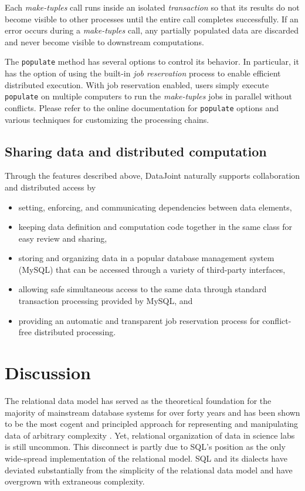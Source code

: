 \documentclass[10pt,letterpaper]{article}
\newcommand{\matlab}[1]{\texttt{#1}}
\begin{document}
Each \emph{make-tuples} call runs inside an isolated \emph{transaction} so that its results  do not become visible to other processes until the entire call completes successfully. 
If an error occurs during a \emph{make-tuples} call, any partially populated data are discarded and never become visible to downstream computations.

The \matlab{populate} method has several options to control its behavior. 
In particular, it has the option of using the built-in \emph{job reservation} process to enable efficient distributed execution. 
With job reservation enabled, users simply execute \matlab{populate} on multiple computers to run the \emph{make-tuples} jobs in parallel  without conflicts.
Please refer to the online documentation for \matlab{populate} options and various techniques for customizing the processing chains.

\subsection*{Sharing data and distributed computation}
Through the features described above, DataJoint naturally supports collaboration and distributed access by
\begin{itemize}
\item setting, enforcing, and communicating dependencies between data elements,
\item keeping data definition and computation code together in the same class for easy review and sharing,
\item storing and organizing data in a popular database management system (MySQL) that can be accessed through a variety of third-party interfaces,
\item allowing safe simultaneous access to the same data through standard transaction processing provided by MySQL, and
\item providing an automatic and transparent job reservation process for conflict-free distributed processing.
\end{itemize}

\section*{Discussion}
The relational data model has served as the theoretical foundation for the majority of mainstream  database systems for over forty years and has been shown to be the most cogent and principled approach for representing and manipulating data of arbitrary complexity \cite{date_sql_2011}.
Yet, relational organization of data in science labs is still uncommon. 
This disconnect is partly due to SQL's  position as the only wide-spread implementation of the relational model. 
SQL and its dialects have deviated substantially from the simplicity of the relational data model and have overgrown with extraneous complexity.
\end{document}
